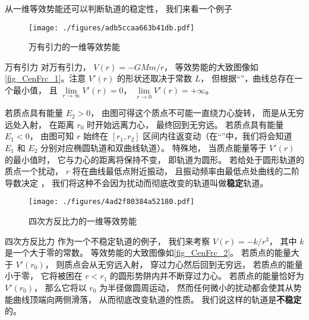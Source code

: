 从一维等效势能还可以判断轨道的稳定性， 我们来看一个例子

\begin{figure}[ht]
\centering
\texttt{[image: ./figures/adb5ccaa663b41db.pdf]}
\caption{万有引力的一维等效势能} \label{fig_CenFrc_1}
\end{figure}

\begin{example}{万有引力}
对万有引力， $V(r) = -GMm/r$， 等效势能的大致图像如\autoref{fig_CenFrc_1}。注意 $V'(r)$ 的形状还取决于常数 $L$， 但根据“”，曲线总存在一个最小值， 且 $\lim\limits_{r\to\infty}V'(r) = 0$， $\lim\limits_{r\to 0} V'(r) = +\infty$。

若质点具有能量 $E_2 > 0$， 由图可得这个质点不可能一直绕力心旋转， 而是从无穷远处入射， 在距离 $r_0$ 时开始远离力心， 最终回到无穷远。 若质点具有能量 $E_1 < 0$， 由图可知 $r$ 始终在 $[r_1, r_2]$ 区间内往返变动（在“”中，我们将会知道 $E_1$ 和 $E_2$ 分别对应椭圆轨道和双曲线轨道）。 特殊地， 当质点能量等于 $V'(r)$ 的最小值时， 它与力心的距离将保持不变， 即轨道为圆形。 若给处于圆形轨道的质点一个扰动， $r$ 将在曲线最低点附近振动， 且振动频率由最低点处曲线的二阶导数决定 %
， 我们将这种不会因为扰动而彻底改变的轨道叫做\textbf{稳定}轨道。
\end{example}

\begin{figure}[ht]
\centering
\texttt{[image: ./figures/4ad2f80384a52180.pdf]}
\caption{四次方反比力的一维等效势能} \label{fig_CenFrc_2}
\end{figure}

\begin{example}{四次方反比力}
作为一个不稳定轨道的例子， 我们来考察 $V(r) = -k/r^3$， 其中 $k$ 是一个大于零的常数。 等效势能的大致图像如\autoref{fig_CenFrc_2}。 若质点的能量大于 $V'(r_0)$， 则质点会从无穷远入射， 穿过力心然后回到无穷远， 若质点的能量小于零， 它将被困在 $r < r_1$ 的圆形势阱内并不断穿过力心。 若质点的能量恰好为 $V'(r_0)$， 那么它将以 $r_0$ 为半径做圆周运动， 然而任何微小的扰动都会使其从势能曲线顶端向两侧滑落， 从而彻底改变轨道的性质。 我们说这样的轨道是\textbf{不稳定}的。
\end{example}
